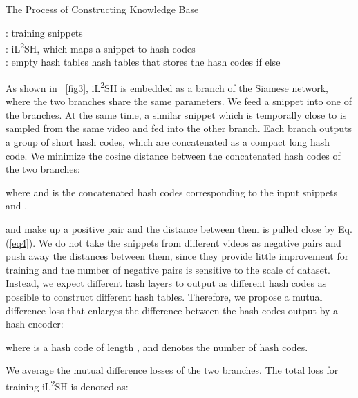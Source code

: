 \documentclass[lettersize,journal]{IEEEtran}
\begin{document}
\begin{algorithm}[!t]
	\caption{The Process of Constructing Knowledge Base} 
	\begin{algorithmic}
		\Require :  training snippets \\
		\quad : iL\textsuperscript{2}SH, which maps a snippet to  hash codes \\
		\quad :  empty hash tables
\Ensure hash tables  that stores the hash codes
		 
				\State    if {} else 
			\EndFor
			\State \Return 
		\EndFunction
		
			\State    {}
				\State   {}
					\State 
					\State 
				\Else
					\State 
					\State 
				\EndIf
			\EndFor
		\EndFor
		
	\end{algorithmic} 
	\label{alg2} 
\end{algorithm}


As shown in \figurename~\ref{fig3}, iL\textsuperscript{2}SH is embedded as a branch of the Siamese network, where the two branches share the same parameters.
We feed a snippet  into one of the branches.
At the same time, a similar snippet  which is temporally close to  is sampled from the same video and fed into the other branch.
Each branch outputs a group of short hash codes, which are concatenated as a compact long hash code.
We minimize the cosine distance between the concatenated hash codes of the two branches:

where  and  is the concatenated hash codes corresponding to the input snippets  and .

 and  make up a positive pair and the distance between them is pulled close by Eq. (\ref{eq4}).
We do not take the snippets from different videos as negative pairs and push away the distances between them, since they provide little improvement for training and the number of negative pairs is sensitive to the scale of dataset.
Instead, we expect different hash layers to output as different hash codes as possible to construct different hash tables.
Therefore, we propose a mutual difference loss that enlarges the difference between the hash codes output by a hash encoder:

where  is a hash code of length , and  denotes the number of hash codes.

We average the mutual difference losses of the two branches.
The total loss for training iL\textsuperscript{2}SH is denoted as:
\end{document}
